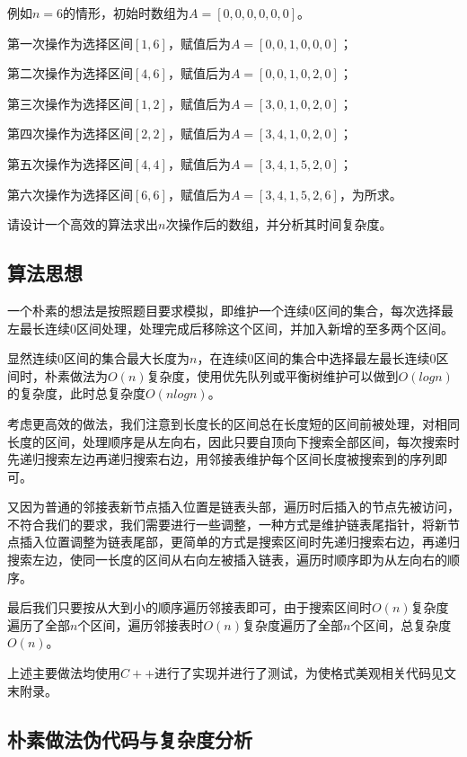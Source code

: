 \documentclass{article}
\begin{document}
例如$n=6$的情形，初始时数组为$A=[0,0,0,0,0,0]$。

第一次操作为选择区间$[1,6]$，赋值后为$A=[0,0,1,0,0,0]$；

第二次操作为选择区间$[4,6]$，赋值后为$A=[0,0,1,0,2,0]$；

第三次操作为选择区间$[1,2]$，赋值后为$A=[3,0,1,0,2,0]$；

第四次操作为选择区间$[2,2]$，赋值后为$A=[3,4,1,0,2,0]$；

第五次操作为选择区间$[4,4]$，赋值后为$A=[3,4,1,5,2,0]$；

第六次操作为选择区间$[6,6]$，赋值后为$A=[3,4,1,5,2,6]$，为所求。

请设计一个高效的算法求出$n$次操作后的数组，并分析其时间复杂度。

\subsection{算法思想}

一个朴素的想法是按照题目要求模拟，即维护一个连续$0$区间的集合，每次选择最左最长连续$0$区间处理，处理完成后移除这个区间，并加入新增的至多两个区间。

显然连续$0$区间的集合最大长度为$n$，在连续$0$区间的集合中选择最左最长连续$0$区间时，朴素做法为$O(n)$复杂度，使用优先队列或平衡树维护可以做到$O(log n)$的复杂度，此时总复杂度$O(n log n)$。

考虑更高效的做法，我们注意到长度长的区间总在长度短的区间前被处理，对相同长度的区间，处理顺序是从左向右，因此只要自顶向下搜索全部区间，每次搜索时先递归搜索左边再递归搜索右边，用邻接表维护每个区间长度被搜索到的序列即可。

又因为普通的邻接表新节点插入位置是链表头部，遍历时后插入的节点先被访问，不符合我们的要求，我们需要进行一些调整，一种方式是维护链表尾指针，将新节点插入位置调整为链表尾部，更简单的方式是搜索区间时先递归搜索右边，再递归搜索左边，使同一长度的区间从右向左被插入链表，遍历时顺序即为从左向右的顺序。

最后我们只要按从大到小的顺序遍历邻接表即可，由于搜索区间时$O(n)$复杂度遍历了全部$n$个区间，遍历邻接表时$O(n)$复杂度遍历了全部$n$个区间，总复杂度$O(n)$。

上述主要做法均使用$C++$进行了实现并进行了测试，为使格式美观相关代码见文末附录。

\subsection{朴素做法伪代码与复杂度分析}
\end{document}

